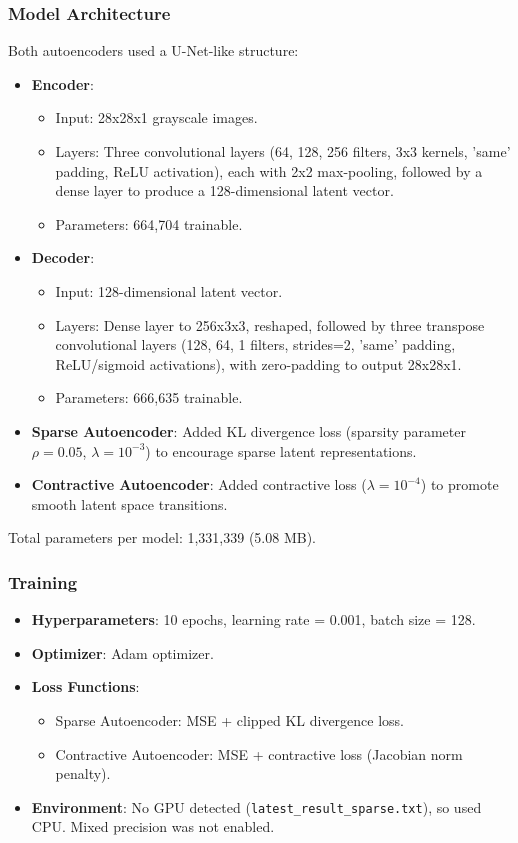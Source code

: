 \documentclass[12pt]{article}
\begin{document}
	\subsubsection{Model Architecture}
	Both autoencoders used a U-Net-like structure:
	\begin{itemize}
		\item \textbf{Encoder}:
		\begin{itemize}
			\item Input: 28x28x1 grayscale images.
			\item Layers: Three convolutional layers (64, 128, 256 filters, 3x3 kernels, 'same' padding, ReLU activation), each with 2x2 max-pooling, followed by a dense layer to produce a 128-dimensional latent vector.
			\item Parameters: 664,704 trainable.
		\end{itemize}
		\item \textbf{Decoder}:
		\begin{itemize}
			\item Input: 128-dimensional latent vector.
			\item Layers: Dense layer to 256x3x3, reshaped, followed by three transpose convolutional layers (128, 64, 1 filters, strides=2, 'same' padding, ReLU/sigmoid activations), with zero-padding to output 28x28x1.
			\item Parameters: 666,635 trainable.
		\end{itemize}
		\item \textbf{Sparse Autoencoder}: Added KL divergence loss (sparsity parameter \(\rho = 0.05\), \(\lambda = 10^{-3}\)) to encourage sparse latent representations.
		\item \textbf{Contractive Autoencoder}: Added contractive loss (\(\lambda = 10^{-4}\)) to promote smooth latent space transitions.
	\end{itemize}
	Total parameters per model: 1,331,339 (5.08 MB).
	
	\subsubsection{Training}
	\begin{itemize}
		\item \textbf{Hyperparameters}: 10 epochs, learning rate = 0.001, batch size = 128.
		\item \textbf{Optimizer}: Adam optimizer.
		\item \textbf{Loss Functions}:
		\begin{itemize}
			\item Sparse Autoencoder: MSE + clipped KL divergence loss.
			\item Contractive Autoencoder: MSE + contractive loss (Jacobian norm penalty).
		\end{itemize}
		\item \textbf{Environment}: No GPU detected (\texttt{latest\_result\_sparse.txt}), so used CPU. Mixed precision was not enabled.
	\end{itemize}
	
\end{document}
